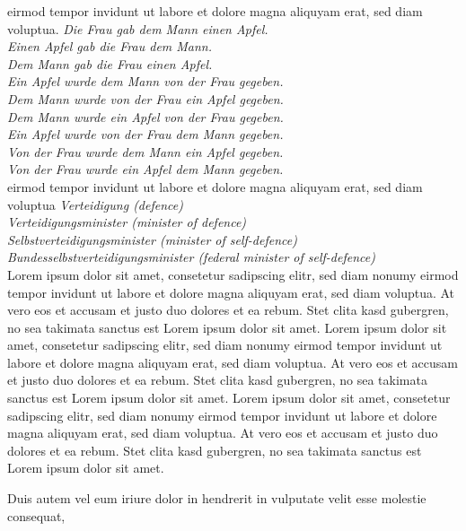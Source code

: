 \documentclass[]{../metanetpaper}
\begin{document}
\begin{Parallel}[c]{80mm}{80mm}
{    eirmod tempor invidunt ut labore et dolore magna aliquyam erat, sed diam voluptua.
    \textit{
      Die Frau gab dem Mann einen Apfel.\\
      Einen Apfel gab die Frau dem Mann.\\
      Dem Mann gab die Frau einen Apfel.\\
      Ein Apfel wurde dem Mann von der Frau gegeben.\\
      Dem Mann wurde von der Frau ein Apfel gegeben.\\
      Dem Mann wurde ein Apfel von der Frau gegeben.\\
      Ein Apfel wurde von der Frau dem Mann gegeben.\\
      Von der Frau wurde dem Mann ein Apfel gegeben.\\
      Von der Frau wurde ein Apfel dem Mann gegeben.}\\
      eirmod tempor invidunt ut labore et dolore magna aliquyam erat, sed diam voluptua
    \textit{
      Verteidigung (defence)\\
      Verteidigungsminister (minister of defence)\\
      Selbstverteidigungsminister (minister of self-defence)\\
      Bundesselbstverteidigungsminister (federal minister of self-defence)}\\
    Lorem ipsum dolor sit amet, consetetur sadipscing elitr, sed diam nonumy eirmod tempor invidunt ut labore et dolore magna aliquyam erat, sed diam voluptua. At vero eos et accusam et justo duo dolores et ea rebum. Stet clita kasd gubergren, no sea takimata sanctus est Lorem ipsum dolor sit amet. Lorem ipsum dolor sit amet, consetetur sadipscing elitr, sed diam nonumy eirmod tempor invidunt ut labore et dolore magna aliquyam erat, sed diam voluptua. At vero eos et accusam et justo duo dolores et ea rebum. Stet clita kasd gubergren, no sea takimata sanctus est Lorem ipsum dolor sit amet. Lorem ipsum dolor sit amet, consetetur sadipscing elitr, sed diam nonumy eirmod tempor invidunt ut labore et dolore magna aliquyam erat, sed diam voluptua. At vero eos et accusam et justo duo dolores et ea rebum. Stet clita kasd gubergren, no sea takimata sanctus est Lorem ipsum dolor sit amet.   

    Duis autem vel eum iriure dolor in hendrerit in vulputate velit esse molestie consequat,
  }
  
\end{Parallel}
\end{document}
